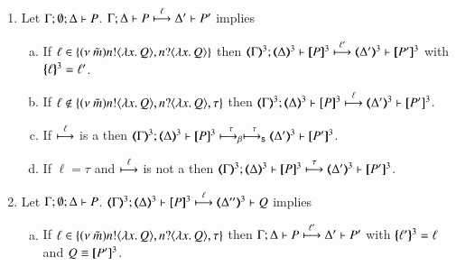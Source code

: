 \begin{proposition}\rm
	\label{prop:op_corr:HOpp_to_HO}
	\begin{enumerate}
		\item	Let $\Gamma; \emptyset; \Delta \vdash P$.
			$\Gamma; \Delta \vdash P \stackrel{\ell}{\longmapsto} \Delta' \vdash P'$ implies
%
			\begin{enumerate}[a)]
				\item	If $\ell \in \{(\nu\ \tilde{m}) n ! \langle \lambda x.\,Q \rangle, n ? \langle \lambda x.\,Q \rangle\}$ then
					$\horel{\tmap{\Gamma}{3}}{\tmap{\Delta}{3}}{\pmap{P}{3}}{\hby{\ell'}}
					{\tmap{\Delta'}{3}}{\pmap{P'}{3}}$ with $\{\!\!\{\ell\}\!\!\}^{3} = \ell'$.

%
%

				\item	If $\ell \notin \{(\nu\ \tilde{m}) n ! \langle \lambda x.\,Q \rangle, n ? \langle \lambda x.\,Q \rangle, \tau\}$ then
					$\horel{\tmap{\Gamma}{3}}{\tmap{\Delta}{3}}{\pmap{P}{3}}{\hby{\ell}}
					{\tmap{\Delta'}{3}}{\pmap{P'}{3}}$.

				\item	If $\stackrel{\ell}{\longmapsto}$ is a \betatran then
					$\horel{\tmap{\Gamma}{3}}{\tmap{\Delta}{3}}{\pmap{P}{3}}{\bhby{\tau} \shby{\tau}}
					{\tmap{\Delta'}{3}}{\pmap{P'}{3}}$.

				\item	If $\ell = \tau$ and $\stackrel{\ell}{\longmapsto}$ is not a \betatran then
					$\horel{\tmap{\Gamma}{3}}{\tmap{\Delta}{3}}{\pmap{P}{3}}{\hby{\tau}}
					{\tmap{\Delta'}{3}}{\pmap{P'}{3}}$.
			\end{enumerate}

		\item	Let $\Gamma; \emptyset; \Delta \vdash P$.
			$\horel{\tmap{\Gamma}{3}}{\tmap{\Delta}{3}}{\pmap{P}{3}}{\hby{\ell}}
			{\tmap{\Delta''}{3}}{Q}$ implies
%
			\begin{enumerate}[a)]
				\item	If $\ell \in \{(\nu\ \tilde{m}) n ! \langle \lambda x.\,Q \rangle, n ? \langle \lambda x.\,Q \rangle, \tau\}$
					then
					$\Gamma; \Delta \vdash P \stackrel{\ell'}{\longmapsto} \Delta' \vdash P'$
					with $\{\!\!\{\ell'\}\!\!\}^{3} = \ell$ and $Q \equiv [\!\![P']\!\!]^{3}$.


\end{enumerate}
\end{enumerate}
\end{proposition}
